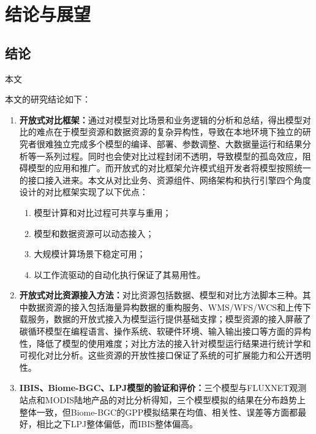 \chapter{结论与展望}

\section{结论}
本文

本文的研究结论如下：
\renewcommand{\labelenumii}{\theenumii}
\renewcommand{\theenumii}{\theenumi.\arabic{enumii}.}
\begin{enumerate}[(1)]
    \item \textbf{开放式对比框架：}通过对模型对比场景和业务逻辑的分析和总结，得出模型对比的难点在于模型资源和数据资源的复杂异构性，导致在本地环境下独立的研究者很难独立完成多个模型的编译、部署、参数调整、大数据量运行和结果分析等一系列过程。同时也会使对比过程封闭不透明，导致模型的孤岛效应，阻碍模型的应用和推广。而开放式的对比框架允许模式组开发者将模型按照统一的接口接入进来。本文从对比业务、资源组件、网络架构和执行引擎四个角度设计的对比框架实现了以下优点：
        \begin{enumerate}[a]
            \item 模型计算和对比过程可共享与重用；
            \item 模型和数据资源可以动态接入；
            \item 大规模计算场景下稳定可用；
            \item 以工作流驱动的自动化执行保证了其易用性。
        \end{enumerate}
    \item \textbf{开放式对比资源接入方法：}对比资源包括数据、模型和对比方法脚本三种。其中数据资源的接入包括海量异构数据的重构服务、WMS/WFS/WCS和上传下载服务，数据的开放式接入为模型运行提供基础支撑；模型资源的接入屏蔽了碳循环模型在编程语言、操作系统、软硬件环境、输入输出接口等方面的异构性，降低了模型的使用难度；对比方法的接入针对模型运行结果进行统计学和可视化对比分析。这些资源的开放性接口保证了系统的可扩展能力和公开透明性。
    \item \textbf{IBIS、Biome-BGC、LPJ模型的验证和评价：}三个模型与FLUXNET观测站点和MODIS陆地产品的对比分析得知，三个模型模拟的结果在分布趋势上整体一致，但Biome-BGC的GPP模拟结果在均值、相关性、误差等方面都最好，相比之下LPJ整体偏低，而IBIS整体偏高。
\end{enumerate}


